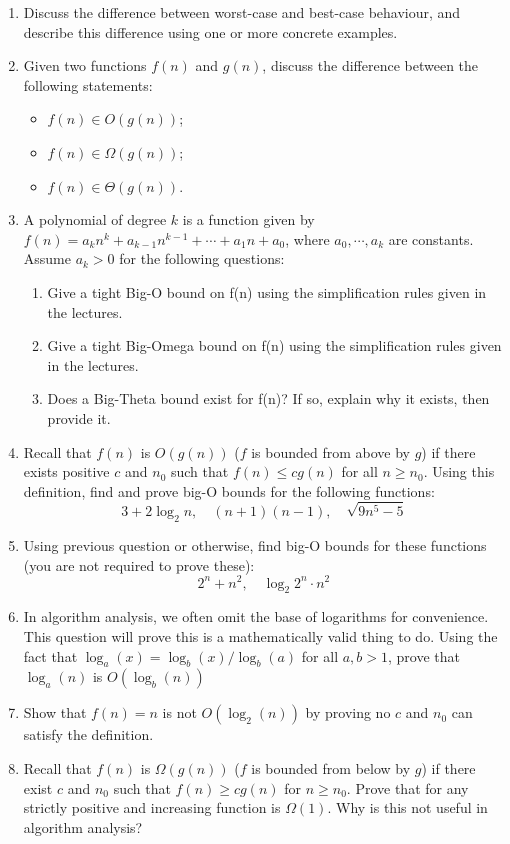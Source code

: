 \documentclass{book}
\begin{document}
\begin{enumerate}
  \item Discuss the difference between worst-case and best-case behaviour, and describe this difference using one or more concrete examples.
  \item Given two functions $f(n)$ and $g(n)$, discuss the difference between the following statements:
    \begin{itemize}
      \item $f(n) \in O(g(n))$;
      \item $f(n) \in \Omega(g(n))$;
      \item $f(n) \in \Theta(g(n))$.
    \end{itemize}
  \item A polynomial of degree $k$ is a function given by $f(n) = a_{k}n^{k} + a_{k - 1}n^{k - 1} + \cdots + a_{1}n + a_{0}$, where $a_{0}, \cdots, a_{k}$ are constants. 
    Assume $a_{k} > 0$ for the following questions:
    \begin{enumerate}
      \item Give a tight Big-O bound on f(n) using the simplification rules given in the lectures.
      \item Give a tight Big-Omega bound on f(n) using the simplification rules given in the lectures.
      \item Does a Big-Theta bound exist for f(n)? If so, explain why it exists, then provide it.
    \end{enumerate}
  \item Recall that $f(n)$ is $O(g(n))$ ($f$ is bounded from above by $g$) if there exists positive $c$ and $n_0$ such that $f(n) \le cg(n)$ for all $n \ge n_0$. Using this definition, find and prove big-O bounds for the following functions:
    $$3 + 2 \log_{2}{n}, \quad (n + 1)(n - 1), \quad \sqrt{9n^{5} - 5}$$
  \item Using previous question or otherwise, find big-O bounds for these functions (you are not required to prove these):
    $$2^{n}+n^{2}, \quad \log_{2}{2^{n} \cdot n^{2}}$$
  \item In algorithm analysis, we often omit the base of logarithms for convenience. This question will prove this is a mathematically valid thing to do.
    Using the fact that $\log_{a}(x) = \log_{b}(x)/\log_{b}(a)$ for all $a, b > 1$, prove that $\log_{a}(n)$ is $O(\log_{b}(n))$
  \item Show that $f(n) = n$ is not $O(\log_{2}(n))$ by proving no $c$ and $n_0$ can satisfy the definition.
  \item Recall that $f(n)$ is $\Omega(g(n))$ ($f$ is bounded from below by $g$) if there exist $c$ and $n_0$ such that $f(n) \ge cg(n)$ for $n \ge n_0$.
    Prove that for any strictly positive and increasing function is $\Omega(1)$. Why is this not useful in algorithm analysis?  
\end{enumerate}
\end{document}
